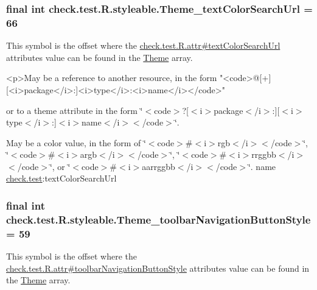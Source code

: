 \subsubsection[{Theme\+\_\+text\+Color\+Search\+Url}]{\setlength{\rightskip}{0pt plus 5cm}final int check.\+test.\+R.\+styleable.\+Theme\+\_\+text\+Color\+Search\+Url = 66\hspace{0.3cm}{\ttfamily [static]}}\label{classcheck_1_1test_1_1_r_1_1styleable_ac9bde1fe29dd51a5aa9486cce5dc77cd}
This symbol is the offset where the \hyperlink{classcheck_1_1test_1_1_r_1_1attr_a7247a03fccf89e3fef4e08fc3f8ae297}{check.\+test.\+R.\+attr\#text\+Color\+Search\+Url} attribute\textquotesingle{}s value can be found in the \hyperlink{classcheck_1_1test_1_1_r_1_1styleable_acca726d02016a0cf607782ec3a436a81}{Theme} array.

\begin{DoxyVerb}      <p>May be a reference to another resource, in the form "<code>@[+][<i>package</i>:]<i>type</i>:<i>name</i></code>"
\end{DoxyVerb}
 or to a theme attribute in the form \char`\"{}$<$code$>$?\mbox{[}$<$i$>$package$<$/i$>$\+:\mbox{]}\mbox{[}$<$i$>$type$<$/i$>$\+:\mbox{]}$<$i$>$name$<$/i$>$$<$/code$>$\char`\"{}. 

May be a color value, in the form of \char`\"{}$<$code$>$\#$<$i$>$rgb$<$/i$>$$<$/code$>$\char`\"{}, \char`\"{}$<$code$>$\#$<$i$>$argb$<$/i$>$$<$/code$>$\char`\"{}, \char`\"{}$<$code$>$\#$<$i$>$rrggbb$<$/i$>$$<$/code$>$\char`\"{}, or \char`\"{}$<$code$>$\#$<$i$>$aarrggbb$<$/i$>$$<$/code$>$\char`\"{}.  name \hyperlink{namespacecheck_1_1test}{check.\+test}\+:text\+Color\+Search\+Url \hypertarget{classcheck_1_1test_1_1_r_1_1styleable_a17c17271f93cd157c12fec0dd05f41e2}{}
\subsubsection[{Theme\+\_\+toolbar\+Navigation\+Button\+Style}]{\setlength{\rightskip}{0pt plus 5cm}final int check.\+test.\+R.\+styleable.\+Theme\+\_\+toolbar\+Navigation\+Button\+Style = 59\hspace{0.3cm}{\ttfamily [static]}}\label{classcheck_1_1test_1_1_r_1_1styleable_a17c17271f93cd157c12fec0dd05f41e2}
This symbol is the offset where the \hyperlink{classcheck_1_1test_1_1_r_1_1attr_abfae1004d8b4a81e368178f12eff90f7}{check.\+test.\+R.\+attr\#toolbar\+Navigation\+Button\+Style} attribute\textquotesingle{}s value can be found in the \hyperlink{classcheck_1_1test_1_1_r_1_1styleable_acca726d02016a0cf607782ec3a436a81}{Theme} array.

